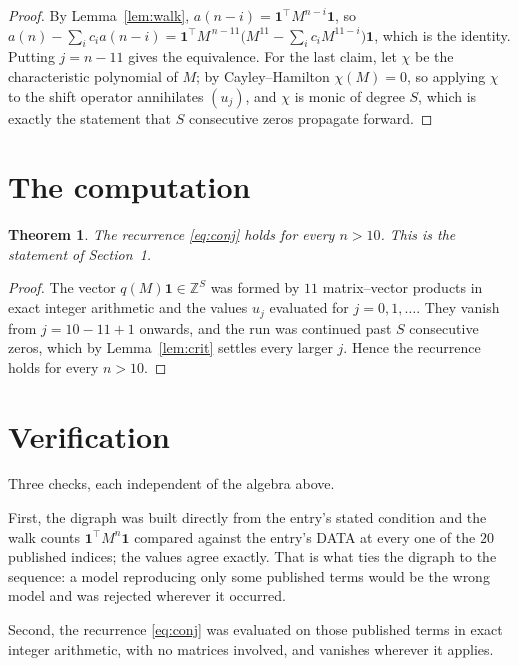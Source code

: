 \documentclass[11pt,a4paper]{article}
\theoremstyle{plain}
\newtheorem{theorem}{Theorem}
\theoremstyle{definition}
\begin{document}
\begin{proof}
By Lemma~\ref{lem:walk}, $a(n-i)=\mathbf{1}^{\!\top}M^{n-i}\mathbf{1}$, so
$a(n)-\sum_i c_i a(n-i)
=\mathbf{1}^{\!\top}M^{\,n-11}\bigl(M^{11}-\sum_i c_i M^{11-i}\bigr)
\mathbf{1}$, which is the identity. Putting $j=n-11$ gives the equivalence. For the
last claim, let $\chi$ be the characteristic polynomial of $M$; by Cayley--Hamilton
$\chi(M)=0$, so applying $\chi$ to the shift operator annihilates $(u_j)$, and $\chi$ is
monic of degree $S$, which is exactly the statement that $S$ consecutive zeros propagate
forward.
\end{proof}

\section{The computation}

\begin{theorem}
The recurrence \eqref{eq:conj} holds for every $n>10$. This is the statement of
Section~1.
\end{theorem}

\begin{proof}
The vector $q(M)\mathbf{1}\in\mathbb{Z}^{S}$ was formed by $11$ matrix--vector
products in exact integer arithmetic and the values $u_j$ evaluated for
$j=0,1,\dots$. They vanish from $j=10-11+1$ onwards, and the run was continued past
$S$ consecutive zeros, which by Lemma~\ref{lem:crit} settles every larger $j$. Hence the
recurrence holds for every $n>10$.
\end{proof}

\section{Verification}

Three checks, each independent of the algebra above.

First, the digraph was built directly from the entry's stated condition and the walk counts
$\mathbf{1}^{\!\top}M^{n}\mathbf{1}$ compared against the entry's DATA at every one of
the $20$ published indices; the values agree exactly. That is what ties the digraph to
the sequence: a model reproducing only some published terms would be the wrong model and
was rejected wherever it occurred.

Second, the recurrence \eqref{eq:conj} was evaluated on those published terms in exact
integer arithmetic, with no matrices involved, and vanishes wherever it applies.
\end{document}
